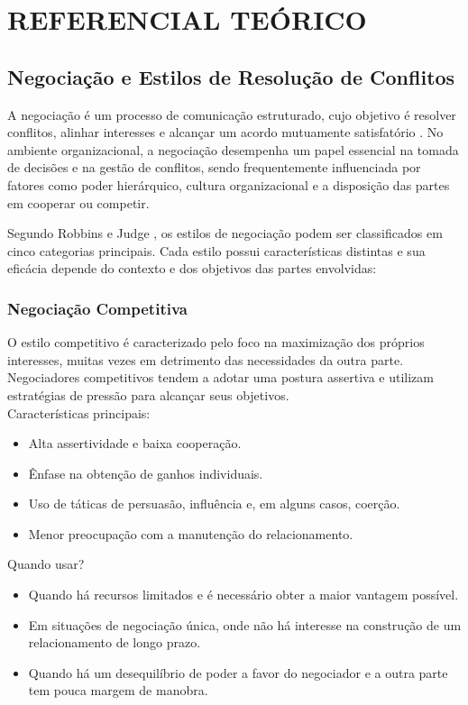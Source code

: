 \documentclass[article,12pt,oneside,a4paper]{article}
\begin{document}
\section{REFERENCIAL TEÓRICO}
\label{sec:orgaed2701}
\subsection{Negociação e Estilos de Resolução de Conflitos}
\label{sec:org9bb1d91}

A negociação é um processo de comunicação estruturado, cujo objetivo é resolver conflitos, alinhar interesses e alcançar um acordo mutuamente satisfatório \cite{lewicki2015negotiation}. No ambiente organizacional, a negociação desempenha um papel essencial na tomada de decisões e na gestão de conflitos, sendo frequentemente influenciada por fatores como poder hierárquico, cultura organizacional e a disposição das partes em cooperar ou competir.

Segundo Robbins e Judge \cite{robbins2015comportamento}, os estilos de negociação podem ser classificados em cinco categorias principais. Cada estilo possui características distintas e sua eficácia depende do contexto e dos objetivos das partes envolvidas:
\subsubsection{Negociação Competitiva}
\label{sec:org17ebe99}

O estilo competitivo é caracterizado pelo foco na maximização dos próprios interesses, muitas vezes em detrimento das necessidades da outra parte. Negociadores competitivos tendem a adotar uma postura assertiva e utilizam estratégias de pressão para alcançar seus objetivos. \\

Características principais:

\begin{itemize}
\item Alta assertividade e baixa cooperação.
\item Ênfase na obtenção de ganhos individuais.
\item Uso de táticas de persuasão, influência e, em alguns casos, coerção.
\item Menor preocupação com a manutenção do relacionamento.
\end{itemize}

Quando usar?

\begin{itemize}
\item Quando há recursos limitados e é necessário obter a maior vantagem possível.
\item Em situações de negociação única, onde não há interesse na construção de um relacionamento de longo prazo.
\item Quando há um desequilíbrio de poder a favor do negociador e a outra parte tem pouca margem de manobra.
\end{itemize}
\end{document}
